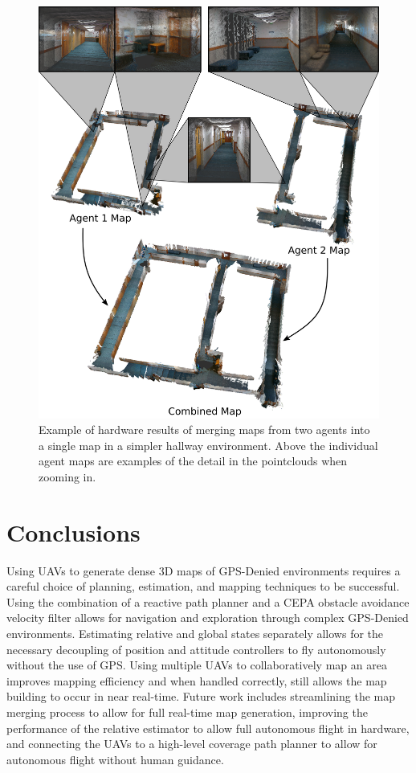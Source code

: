 \documentclass[letterpaper, 10 pt, conference]{ieeeconf}  %
\begin{document}
\begin{figure}
\centering
\includegraphics[width=0.9\linewidth]{wilk3_map.png}
\caption{Example of hardware results of merging maps from two agents into a single map in a simpler hallway environment. Above the individual agent maps are examples of the detail in the pointclouds when zooming in.}
\label{fig:wilk3_map}
\end{figure}
\section{Conclusions}\label{conclusions}

Using UAVs to generate dense 3D maps of GPS-Denied environments requires a careful choice of planning, estimation, and mapping techniques to be successful. Using the combination of a reactive path planner and a CEPA obstacle avoidance velocity filter allows for navigation and exploration through complex GPS-Denied environments. Estimating relative and global states separately allows for the necessary decoupling of position and attitude controllers to fly autonomously without the use of GPS. Using multiple UAVs to collaboratively map an area improves mapping efficiency and when handled correctly, still allows the map building to occur in near real-time. Future work includes streamlining the map merging process to allow for full real-time map generation, improving the performance of the relative estimator to allow full autonomous flight in hardware, and connecting the UAVs to a high-level coverage path planner to allow for autonomous flight without human guidance.



\end{document}
